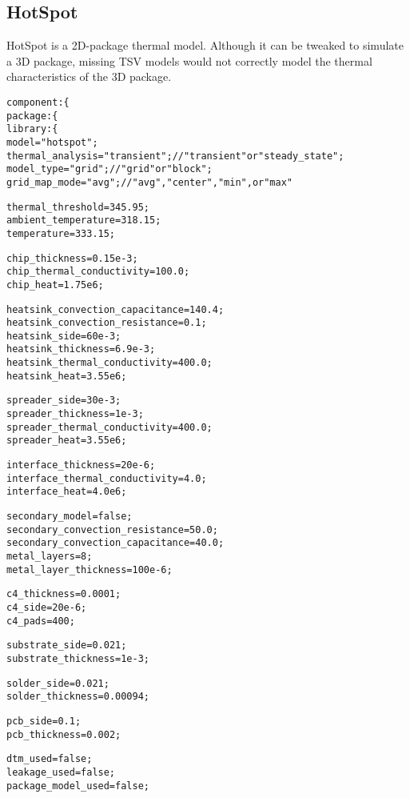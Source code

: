 \subsection{HotSpot}
\noindent
HotSpot is a 2D-package thermal model. 
Although it can be tweaked to simulate a 3D package, missing TSV models would not correctly model the thermal characteristics of the 3D package.
{\fontsize{10pt}{11pt}\selectfont
\begin{alltt}
component: \{
    package: \{
        library: \{
            model = "hotspot";
            thermal_analysis = "transient"; // "transient" or "steady_state";
            model_type = "grid"; // "grid" or "block";
            grid_map_mode = "avg"; // "avg", "center", "min", or "max"
            
            thermal_threshold = 345.95;
            ambient_temperature = 318.15;
            temperature = 333.15;
            
            chip_thickness = 0.15e-3;
            chip_thermal_conductivity = 100.0;
            chip_heat = 1.75e6;

            heatsink_convection_capacitance = 140.4;
            heatsink_convection_resistance = 0.1;
            heatsink_side = 60e-3;
            heatsink_thickness = 6.9e-3;
            heatsink_thermal_conductivity = 400.0;
            heatsink_heat = 3.55e6;

            spreader_side = 30e-3;
            spreader_thickness = 1e-3;
            spreader_thermal_conductivity = 400.0;
            spreader_heat = 3.55e6;

            interface_thickness = 20e-6;
            interface_thermal_conductivity = 4.0;
            interface_heat = 4.0e6;

            secondary_model = false;
            secondary_convection_resistance = 50.0;
            secondary_convection_capacitance = 40.0;
            metal_layers = 8;
            metal_layer_thickness = 100e-6;
                        
            c4_thickness = 0.0001;
            c4_side = 20e-6;
            c4_pads = 400;

            substrate_side = 0.021;
            substrate_thickness = 1e-3;

            solder_side = 0.021;
            solder_thickness = 0.00094;

            pcb_side = 0.1;
            pcb_thickness = 0.002;

            dtm_used = false;
            leakage_used = false;
            package_model_used = false;


\end{alltt}}

